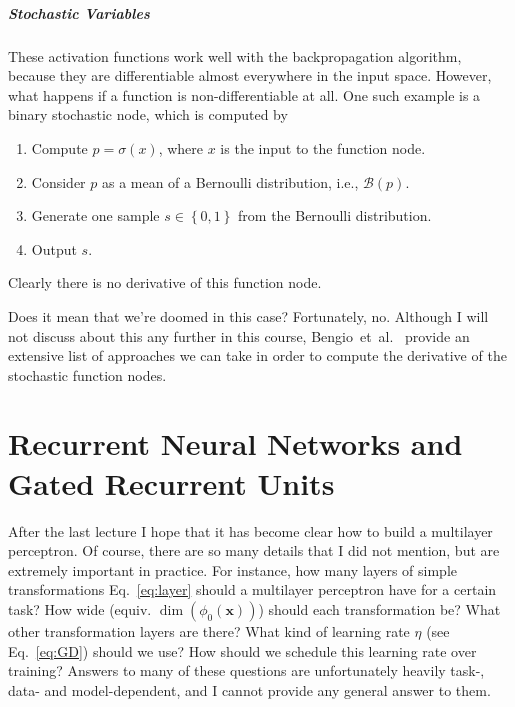\documentclass{report}
\newcommand{\vect}[1]{\mathbf{#1}}
\newcommand{\vx}[0]{\vect{x}}
\newcommand{\BB}[0]{\mathcal{B}}
\begin{document}
\paragraph{Stochastic Variables}
These activation functions work well with the backpropagation algorithm, because
they are differentiable almost everywhere in the input space. However, what
happens if a function is non-differentiable at all. One such example is a binary
stochastic node, which is computed by
\begin{enumerate}
    \itemsep 0em
    \item Compute $p = \sigma(x)$, where $x$ is the input to the function node.
    \item Consider $p$ as a mean of a Bernoulli distribution, i.e., $\BB(p)$.
    \item Generate one sample $s \in \left\{ 0, 1\right\}$ from the Bernoulli distribution.
    \item Output $s$.
\end{enumerate}
Clearly there is no derivative of this function node. 

Does it mean that we're doomed in this case? Fortunately, no. Although I will
not discuss about this any further in this course,
Bengio~et~al.~\cite{bengio2013estimating} provide an extensive list of
approaches we can take in order to compute the derivative of the stochastic
function nodes.



\chapter{Recurrent Neural Networks and Gated Recurrent Units}
\label{chap:rnn}

After the last lecture I hope that it has become clear how to build a multilayer
perceptron. Of course, there are so many details that I did not mention, but are
extremely important in practice. For instance, how many layers of simple
transformations Eq.~\eqref{eq:layer} should a multilayer perceptron have for a
certain task? How wide (equiv. $\dim(\phi_0(\vx))$) should each transformation
be? What other transformation layers are there? What kind of learning rate
$\eta$ (see Eq.~\eqref{eq:GD}) should we use? How should we schedule this
learning rate over training? Answers to many of these questions are
unfortunately heavily task-, data- and model-dependent, and I cannot provide any
general answer to them.

\end{document}
